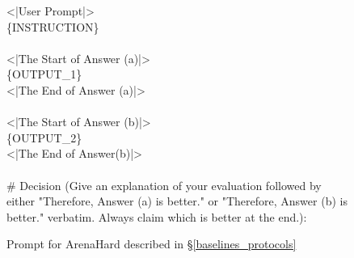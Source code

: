 \begin{figure*}[t!]
\begin{tcolorbox}[colback=black!3!white, colframe=black!70!white, title=ArenaHard, fontupper=\footnotesize, fonttitle=\footnotesize]
<|User Prompt|>\\
\{INSTRUCTION\}
\\ 
\\
<|The Start of Answer (a)|> \\
\{OUTPUT\_1\} \\
<|The End of Answer (a)|>
\\
\\
<|The Start of Answer (b)|> \\
\{OUTPUT\_2\}\\
<|The End of Answer(b)|>\\
\\

\# Decision (Give an explanation of your evaluation followed by either "Therefore, Answer (a) is better." or "Therefore, Answer (b) is better." verbatim. Always claim which is better at the end.):

\end{tcolorbox}
\caption{Prompt for ArenaHard described in \S\ref{baselines_protocols}}
\label{fig:prompt_arena}
\end{figure*}




